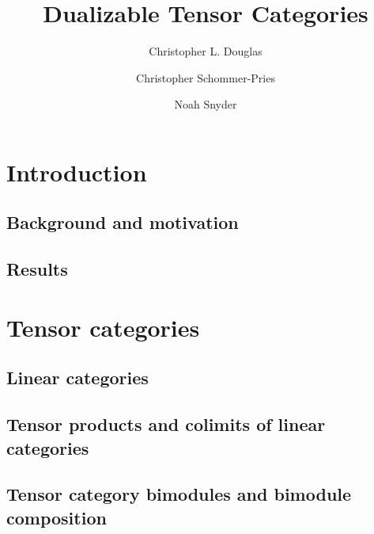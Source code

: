 \documentclass{amsart}
\begin{document}
\title{Dualizable Tensor Categories}

\begin{abstract}

\end{abstract}
	
\author{Christopher L. Douglas}
\address{Department of Mathematics, University of California, Berkeley, CA 94720, USA}
	
\author{Christopher Schommer-Pries}
\address{}
\email{}

\author{Noah Snyder}
\address{}
\email{}

\maketitle	


\section{Introduction}

\subsection{Background and motivation}

\subsection{Results}

\section{Tensor categories}

\subsection{Linear categories}

\subsection{Tensor products and colimits of linear categories}

\subsection{Tensor category bimodules and bimodule composition}
\end{document}
